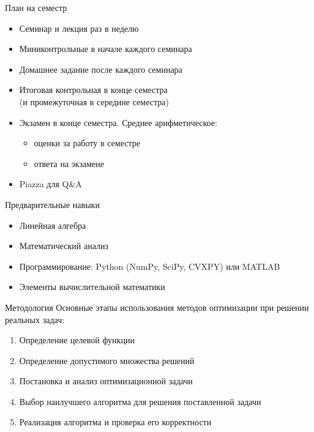 \documentclass[12pt]{beamer}
\begin{document}
\begin{frame}{План на семестр}
\begin{itemize}[<+->]
\item Семинар и лекция раз в неделю
\item Миниконтрольные в начале каждого семинара
\item Домашнее задание после каждого семинара
\item Итоговая контрольная в конце семестра \\ (и промежуточная в середине семестра)
\item Экзамен в конце семестра. Среднее арифметическое:
\begin{itemize}
\item оценки за работу в семестре
\item ответа на экзамене
\end{itemize}
\item Piazza для Q\&A
\end{itemize}
\end{frame}

\begin{frame}{Предварительные навыки}
\begin{itemize}
\item Линейная алгебра
\item Математический анализ
\item Программирование: Python (NumPy, SciPy, CVXPY) или MATLAB
\item Элементы вычислительной математики
\end{itemize}
\end{frame}

\begin{frame}{Методология}
Основные этапы использования методов оптимизации при решении реальных задач:
\begin{enumerate}[<+->]
\item Определение целевой функции
\item Определение допустимого множества решений
\item Постановка и анализ оптимизационной задачи
\item Выбор наилучшего алгоритма для решения поставленной задачи
\item Реализация алгоритма и проверка его корректности
\end{enumerate}

\end{frame}
\end{document}
